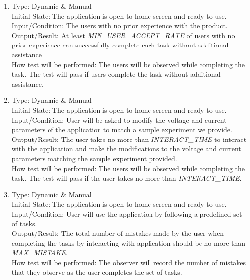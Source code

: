 \documentclass[12pt, titlepage]{article}
\begin{document}
\begin{adjustwidth}{2.2em}{0pt}
\begin{enumerate}[{NF-UT}1.]
  \item Type: Dynamic \& Manual\\
  Initial State: The application is open to home screen  and ready to use.\\
  Input/Condition: The users with no prior experience with the product.\\
  Output/Result: At least \textsl{MIN\_USER\_ACCEPT\_RATE} of users with no prior experience can successfully complete each task without additional assistance\\
  How test will be performed: The users will be observed while completing the task. The test will pass if users complete the task without additional assistance.

  \item Type: Dynamic \& Manual\\
  Initial State: The application is open to home screen  and ready to use.\\
  Input/Condition: User will be asked to modify the voltage and current parameters of the application to match a sample experiment we provide.\\
  Output/Result: The user takes no more than \textsl{INTERACT\_TIME} to interact with the application and make the modifications to the voltage and current parameters matching the sample experiment provided.\\
  How test will be performed: The users will be observed while completing the task. The test will pass if the user takes no more than \textsl{INTERACT\_TIME}.

  \item Type: Dynamic \& Manual \\
  Initial State: The application is open to home screen  and ready to use.\\
  Input/Condition: User will use the application by following a predefined set of tasks.\\
  Output/Result: The total number of mistakes made by the user when completing the tasks by interacting with application should be no more than \textsl{MAX\_MISTAKE}.\\
  How test will be performed: The observer will record the number of mistakes that they observe as the user completes the set of tasks.


\end{enumerate}
\end{adjustwidth}
\end{document}
